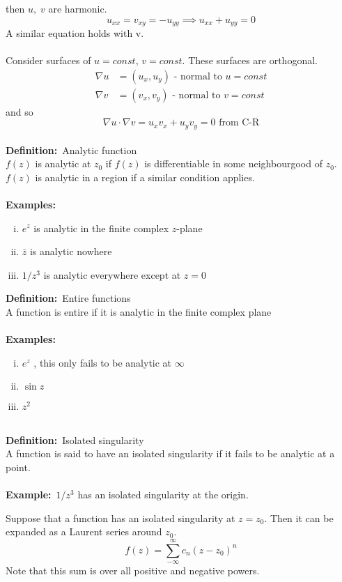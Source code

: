 \documentclass{article}
\newcommand{\definition}{\textbf{Definition:}}
\newcommand{\example}{\textbf{Example:}}
\newcommand{\examples}{\textbf{Examples:}}
\begin{document}
then $u, \; v$ are harmonic.
\[ u_{xx} = v_{xy} = -u_{yy} \implies u_{xx}+u_{yy} =0 \]
A similar equation holds with v.
\\
\\
Consider surfaces of $u=const$, $v=const$. These surfaces are orthogonal.
\begin{align*}
\nabla u &= (u_x,u_y) \mbox{ - normal to } u = const \\
\nabla v &= (v_x,v_y) \mbox{ - normal to } v = const 
\end{align*}
and so
\[ \nabla u \cdot \nabla v = u_xv_x + u_yv_y =0 \mbox{ from C-R} \]
\\
\definition\ Analytic function
\\
$f(z)$ is analytic at $z_0$ if $f(z)$ is differentiable in some neighbourgood
of $z_0$. $f(z)$ is analytic in a region if a similar condition applies.
\\
\\
\examples\
\begin{enumerate}[(i)]
\item $e^z$  is analytic in the finite complex $z$-plane
\item $\bar{z}$ is analytic nowhere
\item $1/z^3$ is analytic everywhere except at $z=0$
\end{enumerate}
\noindent \definition\ Entire functions
\\
A function is entire if it is analytic in the finite complex plane
\\
\\
\examples\
\begin{enumerate}[(i)]
\item $e^z$ , this only fails to be analytic at $\infty$ 
\item $\sin z$ 
\item $z^2$ 
\end{enumerate}
~\\
\definition\ Isolated singularity
\\
A function is said to have an isolated singularity if it fails to
be analytic at a point.
\\
\\
\example\ $1/z^3$ has an isolated singularity at the origin.
\\
\begin{framed}
\noindent Suppose that a function has an isolated singularity at $z=z_0$. Then
it can be expanded as a Laurent series around $z_0$.
\[ f(z) = \sum_{-\infty}^{\infty} c_n (z - z_0)^n \]
Note that this sum is over all positive and negative powers.
\end{framed}
\end{document}
